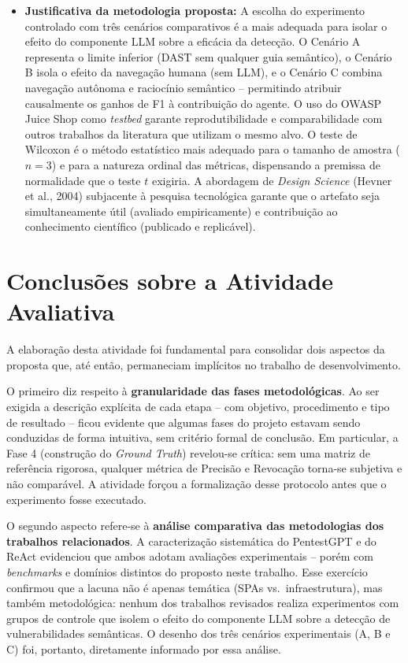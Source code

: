 \documentclass[12pt, a4paper]{article}
\begin{document}
\begin{itemize}
  \item \textbf{Justificativa da metodologia proposta:}
  A escolha do experimento controlado com três cenários comparativos é a mais adequada para isolar o efeito do componente LLM sobre a eficácia da detecção.
  O Cenário A representa o limite inferior (DAST sem qualquer guia semântico), o Cenário B isola o efeito da navegação humana (sem LLM), e o Cenário C combina navegação autônoma e raciocínio semântico -- permitindo atribuir causalmente os ganhos de F1 à contribuição do agente.
  O uso do OWASP Juice Shop como \textit{testbed} garante reprodutibilidade e comparabilidade com outros trabalhos da literatura que utilizam o mesmo alvo.
  O teste de Wilcoxon é o método estatístico mais adequado para o tamanho de amostra ($n = 3$) e para a natureza ordinal das métricas, dispensando a premissa de normalidade que o teste $t$ exigiria.
  A abordagem de \textit{Design Science} (Hevner et al., 2004) subjacente à pesquisa tecnológica garante que o artefato seja simultaneamente útil (avaliado empiricamente) e contribuição ao conhecimento científico (publicado e replicável).

\end{itemize}

\section{Conclusões sobre a Atividade Avaliativa}

A elaboração desta atividade foi fundamental para consolidar dois aspectos da proposta que, até então, permaneciam implícitos no trabalho de desenvolvimento.

O primeiro diz respeito à \textbf{granularidade das fases metodológicas}.
Ao ser exigida a descrição explícita de cada etapa -- com objetivo, procedimento e tipo de resultado -- ficou evidente que algumas fases do projeto estavam sendo conduzidas de forma intuitiva, sem critério formal de conclusão.
Em particular, a Fase 4 (construção do \textit{Ground Truth}) revelou-se crítica: sem uma matriz de referência rigorosa, qualquer métrica de Precisão e Revocação torna-se subjetiva e não comparável.
A atividade forçou a formalização desse protocolo antes que o experimento fosse executado.

O segundo aspecto refere-se à \textbf{análise comparativa das metodologias dos trabalhos relacionados}.
A caracterização sistemática do PentestGPT e do ReAct evidenciou que ambos adotam avaliações experimentais -- porém com \textit{benchmarks} e domínios distintos do proposto neste trabalho.
Esse exercício confirmou que a lacuna não é apenas temática (SPAs vs.\ infraestrutura), mas também metodológica: nenhum dos trabalhos revisados realiza experimentos com grupos de controle que isolem o efeito do componente LLM sobre a detecção de vulnerabilidades semânticas.
O desenho dos três cenários experimentais (A, B e C) foi, portanto, diretamente informado por essa análise.
\end{document}
